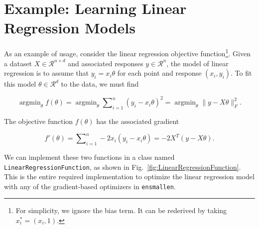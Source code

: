 \documentclass{article}
\DeclareMathOperator*{\argmindown}{argmin}   %
\begin{document}
\vspace*{-0.3em}
\section{Example: Learning Linear Regression Models}
\label{sec:linreg_example}
\vspace*{-0.5em}

As an example of usage, consider the linear regression objective
function\footnote{For simplicity, we ignore the bias term.  It can be
rederived by taking $x^*_i = (x_i, 1)$.}.  Given a dataset $X \in
\mathcal{R}^{n \times d}$ and associated responses $y \in \mathcal{R}^n$, the
model of linear regression is to assume that $y_i = x_i \theta$ for each
point and response $(x_i, y_i)$.  To fit this model $\theta \in \mathcal{R}^d$
to the data, we must find

\vspace*{-0.5em}
\begin{equation}
\argmindown_\theta f(\theta) =   %
\argmindown_\theta \sum\nolimits_{i = 1}^n (y_i - x_i \theta)^2 =
\argmindown_\theta \| y - X \theta \|_F^2.
\end{equation}
\vspace*{-0.5em}

The objective function $f(\theta)$ has the associated gradient

\vspace*{-0.5em}
\begin{equation}
f'(\theta) = \sum\nolimits_{i = 1}^n -2 x_i (y_i - x_i \theta) = -2 X^T (y - X \theta).
\end{equation}
\vspace*{-0.5em}

We can implement these two functions in a class named {\tt LinearRegressionFunction},
as shown in Fig.~\ref{fig:LinearRegressionFunction}.
This is the entire required implementation to optimize the linear regression model with
any of the gradient-based optimizers in {\tt ensmallen}.
\end{document}
